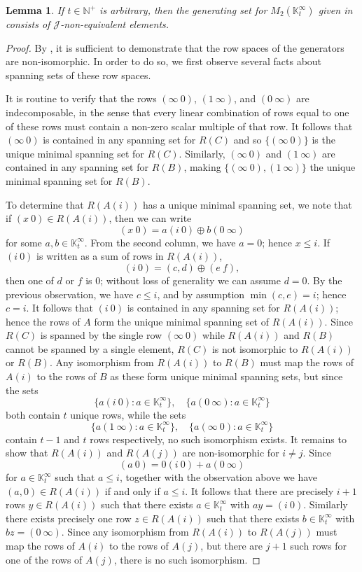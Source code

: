\documentclass[11pt]{article}
\newtheorem{lemma}[thm]{Lemma}
\numberwithin{equation}{section}
\newcommand{\set}[2]{\ensuremath{\{#1 : #2 \}}}
\newcommand{\J}{\mathscr{J}}
\newcommand{\N}{\mathbb{N}}
\newcommand{\Np}{\N^{+}}
\newcommand{\K}{\mathbb{K}}
\newcommand{\Kmint}{\K^{\infty}_t}
\newcommand{\COMMA}{,\quad}
\begin{document}
\begin{lemma}
  If $t \in \Np$ is arbitrary, then the generating set for $M_2(\Kmint)$ given
  in  consists of
  $\J$-non-equivalent elements.
\end{lemma}
\begin{proof}
  By , it is sufficient to
  demonstrate that the row spaces of the generators are non-isomorphic. In order
  to do so, we first observe several facts about spanning sets of these row
  spaces.

  It is routine to verify that the rows $(\infty~0)$, $(1~\infty)$, and
  $(0~\infty)$ are indecomposable, in the sense that every linear combination of
  rows equal to one of these rows must contain a non-zero scalar multiple of
  that row. It follows that $(\infty~0)$ is contained in any spanning set for
  $R(C)$ and so $\{(\infty~0)\}$ is the unique minimal spanning set for $R(C)$.
  Similarly, $(\infty~0)$ and $(1~\infty)$ are contained in any spanning set for
  $R(B)$, making $\{(\infty~0), (1~\infty)\}$ the unique minimal spanning set
  for $R(B)$.

  To determine that $R(A(i))$ has a unique minimal spanning set, we note that if
  $(x~0) \in R(A(i))$, then we can write 
  \[(x~0) = a(i~0) \oplus b(0~\infty) \]
  for some $a, b \in \Kmint$. From the second column, we have $a = 0$;
  hence $x \leq i$. If $(i~0)$ is written as a sum of rows in $R(A(i))$,
  \[(i~0) = (c, d) \oplus (e~f),\]
  then one of $d$ or $f$ is $0$; without loss of generality we can assume $d = 0$.
  By the previous observation, we have $c \leq i$, and by assumption $\min(c, e)
  = i$; hence $c = i$. It follows that $(i~0)$ is contained in any spanning
  set for $R(A(i))$; hence the rows of $A$ form the unique minimal spanning 
  set of $R(A(i))$.
  Since $R(C)$ is spanned by the single row $(\infty~0)$ while $R(A(i))$ and
  $R(B)$ cannot be spanned by a single element, $R(C)$ is not isomorphic
  to $R(A(i))$ or $R(B)$. Any isomorphism from $R(A(i))$ to $R(B)$ must map the
  rows of $A(i)$ to the rows of $B$ as these form unique minimal spanning sets,
  but since the sets
  \[\set{a(i~0)}{a \in \Kmint} \COMMA
    \set{a(0~\infty)}{a \in \Kmint}
  \]
  both contain $t$ unique rows, while the sets 
  \[
    \set{a(1~\infty)}{a \in \Kmint}\COMMA
    \set{a(\infty~0)}{a \in \Kmint}
  \]
  contain $t - 1$ and $t$ rows respectively, no such isomorphism exists.
  It remains to show that $R(A(i))$ and $R(A(j))$ are non-isomorphic for $i \neq
  j$. Since
  \[(a~0) = 0(i~0) + a(0~\infty)\]
  for $a \in \Kmint$ such that $a \leq i$, together with the observation
  above we have $(a, 0) \in R(A(i))$ if and only if $a \leq i$. It follows that
  there are precisely $i + 1$ rows $y \in R(A(i))$ such that there exists $a \in
  \Kmint$ with $ay = (i~0)$. Similarly there exists precisely one row $z
  \in R(A(i))$ such that there exists $b \in \Kmint$ with $bz = (0~\infty)$.
  Since any isomorphism from $R(A(i))$ to $R(A(j))$ must map the rows of $A(i)$
  to the rows of $A(j)$, but there are $j + 1$ such rows for one of the rows of
  $A(j)$, there is no such isomorphism.
\end{proof}
\end{document}
